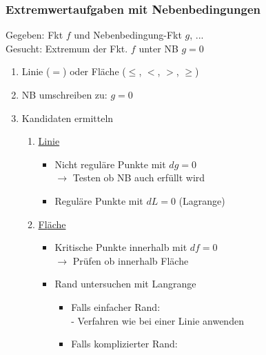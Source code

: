 \documentclass[6pt]{article}
\begin{document}
\begin{multicols*}{3}
		
	\columnbreak		
	\subsubsection*{Extremwertaufgaben mit Nebenbedingungen}	
	
	Gegeben: Fkt $f$ und Nebenbedingung-Fkt $g$, ... \\
	Gesucht: Extremum der Fkt. $f$ unter NB $g=0$
	
		\begin{enumerate}[label=(\roman*), itemsep=2pt, parsep=2pt]
			\item Linie ($=$) oder Fl{\"a}che ($\leq$, $<$, $>$, $\geq$)	
			\item NB umschreiben zu: $g=0$
			\item Kandidaten ermitteln
						\begin{enumerate}[ itemsep=2pt, parsep=2pt]
							\item \underline{Linie} \\
									\vspace{-3mm}
									\begin{itemize}
											\item 	Nicht regul{\"a}re Punkte mit $dg=0$ \\
														$\rightarrow$ Testen ob NB auch erf{\"u}llt wird
											\item 	Regul{\"a}re Punkte mit $dL=0$ (Lagrange)
									\end{itemize}
									\vspace{1mm}
							\item \underline{Fl{\"ache}}\\
									\vspace{-3mm}
									\begin{itemize}
											\item 	Kritische Punkte innerhalb mit $df=0$ \\
														$\rightarrow$ Pr{\"u}fen ob innerhalb Fl{\"a}che
											\item 	Rand untersuchen mit Langrange \\
														\vspace{-3mm}
														\begin{itemize}
																\item Falls einfacher Rand: \\
																		- Verfahren wie bei einer Linie anwenden
																\item Falls komplizierter Rand: \\

\end{itemize}
\end{itemize}
\end{enumerate}
\end{enumerate}
\end{multicols*}
\end{document}
